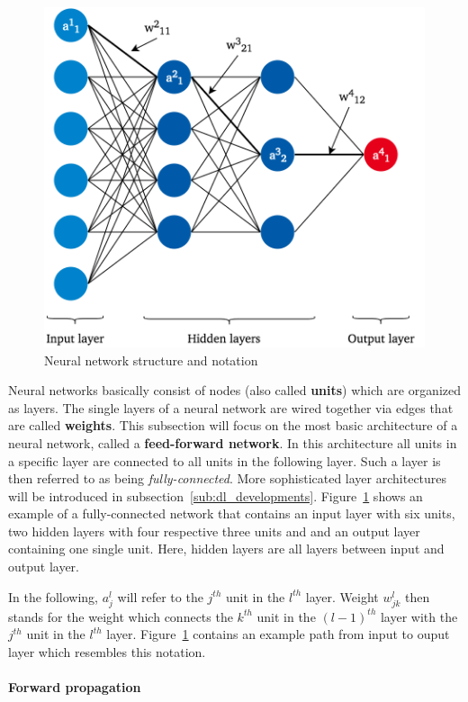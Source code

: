 \begin{figure}[h]
  \includegraphics[height=10cm]{img/nn_architecture_2}
  \caption{Neural network structure and notation}
\label{fig:nn_architecture}
\end{figure}

Neural networks basically consist of nodes (also called \textbf{units}) which
are organized as layers.
The single layers of a neural network are wired together via edges that are
called \textbf{weights}.
This subsection will focus on the most basic architecture of a neural network,
called a \textbf{feed-forward network}.
In this architecture all units in a specific layer are connected to all units
in the following layer.
Such a layer is then referred to as being \textit{fully-connected}.
More sophisticated layer architectures will be introduced in subsection~\ref{sub:dl_developments}.
Figure~\ref{fig:nn_architecture} shows an example of a fully-connected network
that contains an input layer with six units, two hidden layers with four respective
three units and and an output layer containing one single unit.
Here, hidden layers are all layers between input and output layer.

In the following, $a_j^l$ will refer to the $j^{th}$ unit in the $l^{th}$ layer.
Weight $w_{jk}^l$ then stands for the weight which connects the $k^{th}$ unit in
the ${(l-1)}^{th}$ layer with the $j^{th}$ unit in the $l^{th}$ layer.
Figure~\ref{fig:nn_architecture} contains an example path from input to ouput
layer which resembles this notation.

\paragraph{Forward propagation}
\label{sub:dl_forward}

